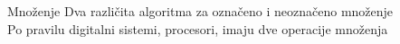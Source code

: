 
\begin{frame}[label=05-s043]{Množenje}
Dva različita algoritma za označeno i neoznačeno množenje\\
Po pravilu digitalni sistemi, procesori, imaju dve operacije množenja
\begin{center}\vspace{8mm}{\Large MPY - neoznačeno\\[3mm]MPYS – signed - označeno\par}\end{center}
\end{frame}
